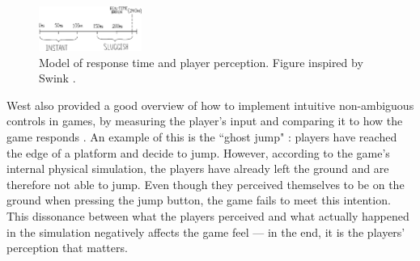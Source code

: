 \begin{figure}[htbp]
\centering
\includegraphics[width=0.30\textwidth]{Pics/response}
\caption{Model of response time and player perception. Figure inspired by Swink \cite{swink}.}
\label{fig:response}
\end{figure}

West also provided a good overview of how to implement intuitive non-ambiguous controls in games, by measuring the player's input and comparing it to how the game responds \cite{intuitive_buttons}. An example of this is the ``ghost jump" \cite{ghostJump, canabalt}: players have reached the edge of a platform and decide to jump. However, according to the game's internal physical simulation, the players have already left the ground and are therefore not able to jump. Even though they perceived themselves to be on the ground when pressing the jump button, the game fails to meet this intention. This dissonance between what the players perceived and what actually happened in the simulation negatively affects the game feel --- in the end, it is the players' perception that matters.


